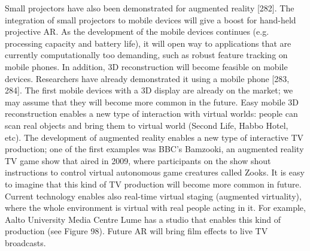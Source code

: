 Small projectors have also been demonstrated for augmented reality [282]. The integration of small projectors to mobile devices will give a boost for hand-held projective AR. As the development of the mobile devices continues (e.g. processing capacity and battery life), it will open way to applications that are currently computationally too demanding, such as robust feature tracking on mobile phones. In addition, 3D reconstruction will become feasible on mobile devices. Researchers have already demonstrated it using a mobile phone [283, 284]. The first mobile devices with a 3D display are already on the market; we may assume that they will become more common in the future. Easy mobile 3D reconstruction enables a new type of interaction with virtual worlds: people can scan real objects and bring them to virtual world (Second Life, Habbo Hotel, etc). The development of augmented reality enables a new type of interactive TV production; one of the first examples was BBC’s Bamzooki, an augmented reality TV game show that aired in 2009, where participants on the show shout instructions to control virtual autonomous game creatures called Zooks. It is easy to imagine that this kind of TV production will become more common in future. Current technology enables also real-time virtual staging (augmented virtuality), where the whole environment is virtual with real people acting in it. For example, Aalto University Media Centre Lume has a studio that enables this kind of production (see Figure 98). Future AR will bring film effects to live TV broadcasts.

